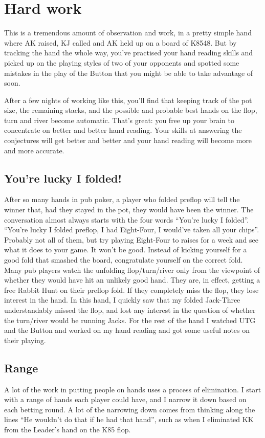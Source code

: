 \section{Hard work}

This is a tremendous amount of observation and work, in a pretty simple
hand where AK raised, KJ called and AK held up on a board of K8548. But
by tracking the hand the whole way, you've practised your hand reading skills
and picked up on the playing styles of two of your opponents and spotted
some mistakes in the play of the Button that you might be able to
take advantage of soon.

After a few nights of working like this, you'll find that keeping track
of the pot size, the remaining stacks, and the possible and probable
best hands on the flop, turn and river become automatic. That's great: you
free up your brain to concentrate on better and better hand reading. Your
skills at answering the conjectures will get better and better and your
hand reading will become more and more accurate.

\subsection*{You're lucky I folded!}

After so many hands in pub poker, a player who folded preflop will
tell the winner that, had they stayed in the pot, they would have been
the winner. The conversation almost always starts with the four words
``You're lucky I folded''. ``You're lucky I folded preflop, I had
Eight-Four, I would've taken all your chips''. Probably not all of
them, but try playing Eight-Four to raises for a week and see what it
does to your game. It won't be good. Instead of kicking yourself for a
good fold that smashed the board, congratulate yourself on the correct
fold. Many pub players watch the unfolding
flop/turn/river only from the viewpoint of whether they would have hit
an unlikely good hand. They are, in effect, getting a free Rabbit Hunt
on their preflop fold. If they completely miss the flop, they lose
interest in the hand. In this hand, I quickly saw that my folded
Jack-Three understandably missed the flop, and lost any interest in
the question of whether the turn/river would be running Jacks. For the
rest of the hand I watched UTG and the Button and worked on my hand
reading and got some useful notes on their playing.

\subsection*{Range}
A lot of the work in putting people on hands uses a process
of elimination. I start with a range of hands each player could have,
and I narrow it down based on each betting round. A lot of the narrowing
down comes from thinking along the lines ``He wouldn't do that if he
had that hand'', such as when I eliminated KK from the Leader's hand
on the K85 flop.

